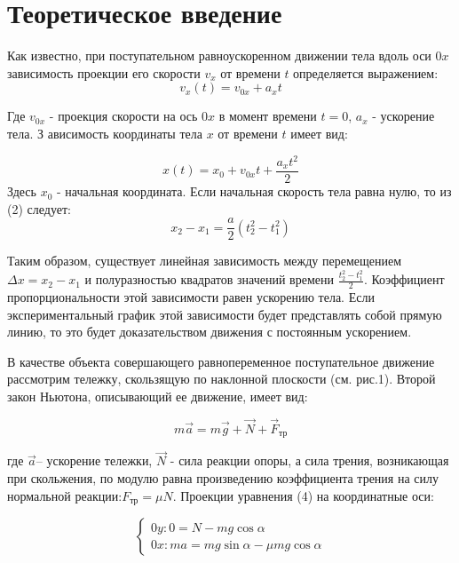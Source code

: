 \documentclass[a4paper]{article}
\begin{document}
\section{Теоретическое введение}

 Как известно, при поступательном равноускоренном движении тела вдоль оси $0x$ зависимость проекции его скорости $v_x$ от времени $t$ определяется выражением:
\begin{equation}
	v_x(t) = v_{0x} +a_xt
\end{equation}

Где $v_{0x}$ - проекция скорости на ось $0x$ в момент времени $t=0$, $a_x$ - ускорение тела. З
ависимость координаты тела $x$ от времени $t$ имеет вид:

\begin{equation}
	x(t) = x_0+ v_{0x}t +\frac{ a_xt^2}{2}
\end{equation}
Здесь $x_0$ - начальная координата. Если начальная скорость тела равна нулю, то из (2) следует:
\begin{equation}
	x_2-x_1=\frac{a}{2}(t_2^2-t_1^2)
\end{equation}

Таким образом, существует линейная зависимость между перемещением $\Delta x=x_2-x_1$ и полуразностью квадратов значений времени $\frac{t_2^2-t_1^2}{2}$. Коэффициент пропорциональности этой зависимости равен ускорению тела. Если экспериментальный график этой зависимости будет представлять собой прямую линию, то это будет доказательством движения с постоянным ускорением.

В качестве объекта совершающего равнопеременное поступательное движение рассмотрим тележку, скользящую по наклонной плоскости (см. рис.1). Второй закон Ньютона, описывающий ее движение, имеет вид:

\begin{equation}
	m\vec{a} = m\vec{g}+\vec{N}+\vec{F}_{\text{тр}}
\end{equation}

где $\vec{a}$– ускорение тележки, $\vec{N}$ - сила реакции опоры, а сила трения, возникающая при скольжения, по модулю равна произведению коэффициента трения на силу нормальной реакции:$F_{\text{тр}}=\mu N$. Проекции уравнения (4) на координатные оси:

\begin{equation}
\begin{cases}
0y: 0=N-mg\cos\alpha \\
0x: ma=mg\sin\alpha-\mu mg\cos\alpha
\end{cases}
\end{equation}
\end{document}
